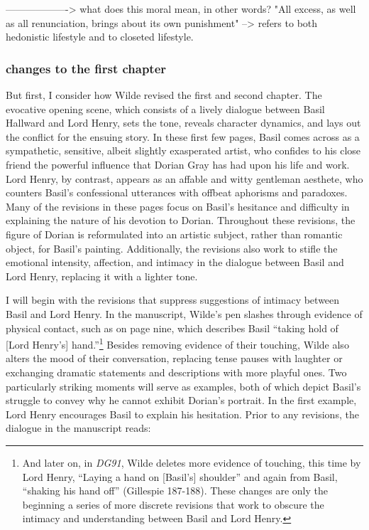 \documentclass[11pt]{article}
\begin{document}
-------------------> what does this moral mean, in other words? "All
excess, as well as all renunciation, brings about its own punishment"
--> refers to both hedonistic lifestyle and to closeted lifestyle. 

\subsubsection{changes to the first chapter}
\label{sec:org1c381c8}

But first, I consider how Wilde revised the first and second
chapter. The evocative opening scene, which consists of a lively
dialogue between Basil Hallward and Lord Henry, sets the tone, reveals
character dynamics, and lays out the conflict for the ensuing
story. In these first few pages, Basil comes across as a sympathetic,
sensitive, albeit slightly exasperated artist, who confides to his
close friend the powerful influence that Dorian Gray has had upon his
life and work. Lord Henry, by contrast, appears as an affable and
witty gentleman aesthete, who counters Basil’s confessional utterances
with offbeat aphorisms and paradoxes. Many of the revisions in these
pages focus on Basil’s hesitance and difficulty in explaining the
nature of his devotion to Dorian. Throughout these revisions, the
figure of Dorian is reformulated into an artistic subject, rather than
romantic object, for Basil’s painting. Additionally, the revisions
also work to stifle the emotional intensity, affection, and intimacy
in the dialogue between Basil and Lord Henry, replacing it with a
lighter tone.

I will begin with the revisions that suppress suggestions of intimacy
between Basil and Lord Henry. In the manuscript, Wilde’s pen slashes
through evidence of physical contact, such as on page nine, which
describes Basil “taking hold of [Lord Henry’s] hand.”\footnote{And later on, in \emph{DG91}, Wilde deletes more evidence of
touching, this time by Lord Henry, “Laying a hand on [Basil’s]
shoulder” and again from Basil, “shaking his hand off” (Gillespie
187-188). These changes are only the beginning a series of more
discrete revisions that work to obscure the intimacy and understanding
between Basil and Lord Henry.} Besides
removing evidence of their touching, Wilde also alters the mood of
their conversation, replacing tense pauses with laughter or exchanging
dramatic statements and descriptions with more playful ones. Two
particularly striking moments will serve as examples, both of which
depict Basil’s struggle to convey why he cannot exhibit Dorian’s
portrait. In the first example, Lord Henry encourages Basil to explain
his hesitation. Prior to any revisions, the dialogue in the manuscript
reads:
\end{document}
